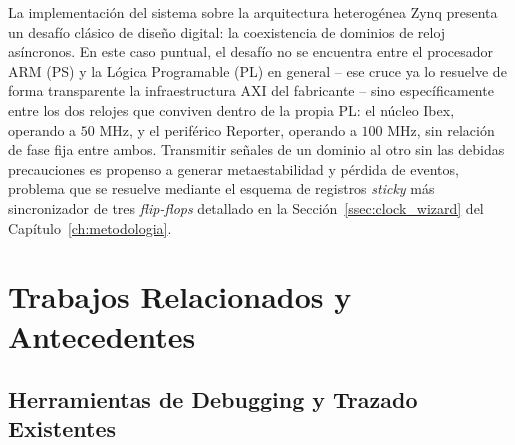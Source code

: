      La implementación del sistema sobre la arquitectura heterogénea Zynq
     presenta un desafío clásico de diseño digital: la coexistencia de
     dominios de reloj asíncronos. En este caso puntual, el desafío no se
     encuentra entre el procesador ARM (PS) y la Lógica Programable (PL)
     en general -- ese cruce ya lo resuelve de forma transparente la
     infraestructura AXI del fabricante -- sino específicamente entre los
     dos relojes que conviven dentro de la propia PL: el núcleo Ibex,
     operando a $50\text{ MHz}$, y el periférico Reporter, operando a
     $100\text{ MHz}$, sin relación de fase fija entre ambos. Transmitir
     señales de un dominio al otro sin las debidas precauciones es
     propenso a generar metaestabilidad y pérdida de eventos, problema que
     se resuelve mediante el esquema de registros \textit{sticky} más
     sincronizador de tres \textit{flip-flops} detallado en la
     Sección~\ref{ssec:clock_wizard} del Capítulo~\ref{ch:metodologia}.


\section{Trabajos Relacionados y Antecedentes}
\label{sec:trabajos_relacionados}

\subsection{Herramientas de Debugging y Trazado Existentes}
\label{ssec:herramientas_existentes}

